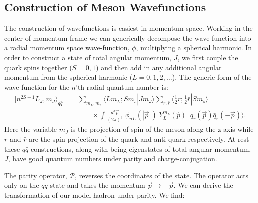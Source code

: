 
\subsection{Construction of Meson Wavefunctions}

The construction of wavefunctions is easiest in momentum space. Working in the center of momentum frame we can generically decompose the wave-function into a radial momentum space wave-function, $\phi$, multiplying a spherical harmonic.  In order to construct a state of total angular momentum, $J$, we first couple the quark spins together ($S=0,1$) and then add in any additional angular momentum from the spherical harmonic ($L=0,1,2,\ldots$). The generic form of the wave-function for the $n$'th radial quantum number is: 
\begin{align*}
| n^{2S+1}L_J , m_J \rangle_{q\bar{q}} =   &\sum_{m_L, m_s} \langle L m_L; S m_s | J m_J \rangle \sum_{r,\bar{r}} \langle \tfrac{1}{2}  r; \tfrac{1}{2} \bar{r} | S m_s \rangle  \\
& \qquad \times \int  \frac{d^3\vec{p}}{(2\pi)^3}  \;\phi_{nL}( | \vec{p}|) \; Y_{L}^{m_L}(\hat{p}) \; \Big|q_{r}(\vec{p}) \bar{q}_{\bar{r}}(-\vec{p}) \Big\rangle . 
\end{align*}
Here the variable $m_J$ is the projection of spin of the meson along the z-axis while $r$ and $\bar{r}$ are the spin projection of the quark and anti-quark respectively. At rest these $q\bar{q}$ constructions, along with being eigenstates of total angular momentum, $J$, have good quantum numbers under parity and charge-conjugation. 

The parity operator, $\mathcal{P}$, reverses the coordinates of the state. The operator acts only on the $q\bar{q}$ state and takes the momentum $\vec{p} \rightarrow -\vec{p}$. We can derive the transformation of our model hadron under parity. We find: 

